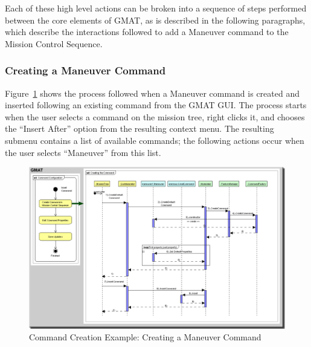 Each of these high level actions can be broken into a sequence of steps performed between the core
elements of GMAT, as is described in the following paragraphs, which describe the interactions
followed to add a Maneuver command to the Mission Control Sequence.

\subsubsection{\label{section:CommandCreation}Creating a Maneuver Command}

Figure~\ref{figure:ManeuverCreation} shows the process followed when a Maneuver command is created
and inserted following an existing command from the GMAT GUI.  The process starts when the user
selects a command on the mission tree, right clicks it, and chooses the ``Insert After'' option
from the resulting context menu.  The resulting submenu contains a list of available commands; the
following actions occur when the user selects ``Maneuver'' from this list.

\begin{landscape}
\begin{figure}[htb]
\begin{center}
\includegraphics[560,355]{Images/ManeuverCreation.png}
\caption{\label{figure:ManeuverCreation}Command Creation Example: Creating a Maneuver Command}
\end{center}
\end{figure}
\end{landscape}

